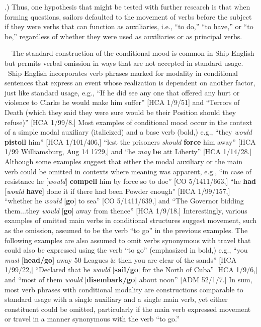 \documentclass[12pt]{article}
\newenvironment{styleStandard}{\renewcommand\baselinestretch{1.0}\setlength\leftskip{0cm}\setlength\rightskip{0cm plus 1fil}\setlength\parindent{0cm}\setlength\parfillskip{0pt plus 1fil}\setlength\parskip{0in plus 1pt}\writerlistparindent\writerlistleftskip\leavevmode\normalfont\normalsize\writerlistlabel\ignorespaces}{\unskip\vspace{0in plus 1pt}\par}
\newcommand\writerlistleftskip{}
\newcommand\writerlistparindent{}
\newcommand\writerlistlabel{}
\begin{document}
\begin{styleStandard}
1700.)} Thus, one hypothesis that might be tested with further research is that when forming questions, sailors defaulted to the movement of verbs before the subject if they were verbs that can function as auxiliaries, i.e., “to do,” “to have,” or “to be,” regardless of whether they were used as auxiliaries or as principal verbs.
\end{styleStandard}


\begin{styleStandard}
\ \ The standard construction of the conditional mood is common in Ship English but permits verbal omission in ways that are not accepted in standard usage. \ Ship English incorporates verb phrases marked for modality in conditional sentences that express an event whose realization is dependent on another factor, just like standard usage, e.g., “If he did see any one that offered any hurt or violence to Clarke he would make him suffer” [HCA 1/9/51] and “Terrors of Death (which they said they were sure would be their Position should they refuse)” [HCA 1/99/8.] Most examples of conditional mood occur in the context of a simple modal auxiliary (italicized) and a base verb (bold,) e.g., “they \textit{would} \textbf{pistoll }him” [HCA 1/101/406,] “lest the prisoners \textit{should}\textbf{ force} him away” [HCA 1/99 Williamsburg, Aug 14 1729,] and “he \textit{may} \textbf{be} att Liberty” [HCA 1/14/28.] Although some examples suggest that either the modal auxiliary or the main verb could be omitted in contexts where meaning was apparent, e.g., “in case of resistance he [\textit{would}] \textbf{compell }him by force so to doe” [CO 5/1411/663,] “he \textbf{had} [\textit{would} \textbf{have}] done it if there had been Powder enough” [HCA 1/99/157,] “whether he \textit{would} [\textbf{go}] to sea” [CO 5/1411/639,] and “The Governor bidding them...they \textit{would} [\textbf{go}] away from thence” [HCA 1/9/18.] Interestingly, various examples of omitted main verbs in conditional structures suggest movement, such as the omission, assumed to be the verb “to go” in the previous examples. The following examples are also assumed to omit verbs synonymous with travel that could also be expressed using the verb “to go” (emphasized in bold,) e.g., “you \textit{must} [\textbf{head/go}] away 50 Leagues \& then you are clear of the sands” [HCA 1/99/22,] “Declared that he \textit{would }[\textbf{sail/go}] for the North of Cuba” [HCA 1/9/6,] and “most of them \textit{would }[\textbf{disembark/go}] about noon” [ADM 52/1/7.] In sum, most verb phrases with conditional modality are constructions comparable to standard usage with a single auxiliary and a single main verb, yet either constituent could be omitted, particularly if the main verb expressed movement or travel in a manner synonymous with the verb “to go.”
\end{styleStandard}
\end{document}
